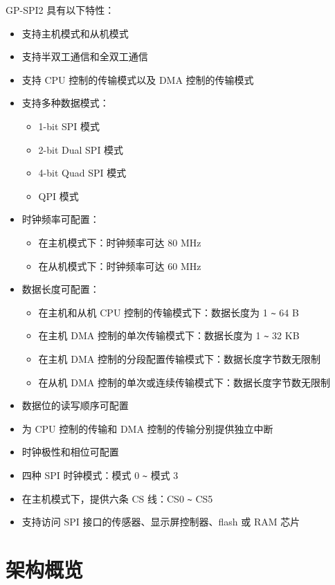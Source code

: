 \documentclass[main\_\_CN.tex]{subfiles}
\begin{document}
GP-SPI2 具有以下特性：
\begin{itemize}
    \item 支持主机模式和从机模式
    \item 支持半双工通信和全双工通信
    \item 支持 CPU 控制的传输模式以及 DMA 控制的传输模式
    \item 支持多种数据模式：
        \begin{itemize}
            \item 1-bit SPI 模式
            \item 2-bit Dual SPI 模式
            \item 4-bit Quad SPI 模式
            \item QPI 模式
        \end{itemize}
    \item 时钟频率可配置：
        \begin{itemize}
        \item 在主机模式下：时钟频率可达 80 MHz
            \item 在从机模式下：时钟频率可达 60 MHz
        \end{itemize}
    \item 数据长度可配置：
    \begin{itemize}
        \item 在主机和从机 CPU 控制的传输模式下：数据长度为 1 \verb+~+ 64 B
        \item 在主机 DMA 控制的单次传输模式下：数据长度为 1 \verb+~+ 32 KB
        \item 在主机 DMA 控制的分段配置传输模式下：数据长度字节数无限制
        \item 在从机 DMA 控制的单次或连续传输模式下：数据长度字节数无限制
    \end{itemize}
    \item 数据位的读写顺序可配置
    \item 为 CPU 控制的传输和 DMA 控制的传输分别提供独立中断
    \item 时钟极性和相位可配置
    \item 四种 SPI 时钟模式：模式 0 \verb+~+ 模式 3
    \item 在主机模式下，提供六条 CS 线：CS0 \verb+~+ CS5
    \item 支持访问 SPI 接口的传感器、显示屏控制器、flash 或 RAM 芯片
\end{itemize}

\section{架构概览}
\end{document}
